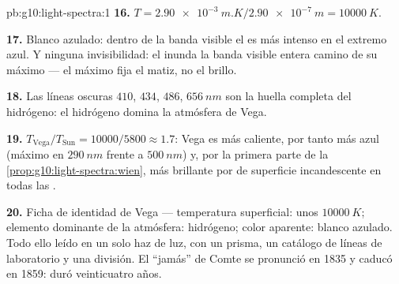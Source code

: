 \begin{solution}{pb:g10:light-spectra:1}
\textbf{16.} $T = \qty{2.90e-3}{m.K} / \qty{2.90e-7}{m}
= \qty{10000}{K}$.

\textbf{17.} Blanco azulado: dentro de la banda visible el  es
más intenso en el extremo azul. Y ninguna invisibilidad: el  inunda la banda visible entera camino de su máximo 
--- el máximo fija el matiz, no el brillo.

\textbf{18.} Las líneas oscuras $410$, $434$, $486$, $\qty{656}{nm}$ son
la huella completa del hidrógeno: el hidrógeno domina la atmósfera de
Vega.

\textbf{19.} $T_{\text{Vega}} / T_{\text{Sun}} = 10000 / 5800 \approx
1.7$: Vega es más caliente, por tanto más azul (máximo en
$\qty{290}{nm}$ frente a $\qty{500}{nm}$) y, por la primera parte de la
\cref{prop:g10:light-spectra:wien}, más brillante por  de
superficie incandescente en todas las .

\textbf{20.} Ficha de identidad de Vega --- temperatura superficial:
unos $\qty{10000}{K}$; elemento dominante de la atmósfera: hidrógeno;
color aparente: blanco azulado. Todo ello leído en un solo haz de luz,
con un prisma, un catálogo de líneas de laboratorio y una división. El
``jamás'' de Comte se pronunció en 1835 y caducó en 1859: duró
veinticuatro años.
\end{solution}
